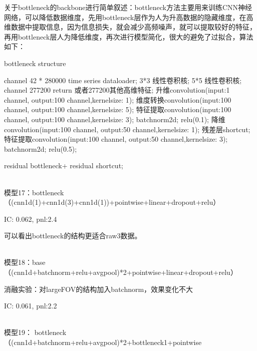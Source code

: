 \documentclass[11pt]{ctexart}
\begin{document}
关于bottleneck的backbone进行简单叙述：bottleneck方法主要用来训练CNN神经网络，可以降低数据维度，先用bottleneck层作为人为升高数据的隐藏维度，在高维数据中提取信息，因为信息损失，就会减少高频噪声，就可以提取较好的特征，再用bottleneck层人为降低维度，再次进行模型简化，很大的避免了过拟合，算法如下：
\renewcommand{\algorithmicrequire}{\textbf{Input:}}  %
\renewcommand{\algorithmicensure}{\textbf{Output:}} %
  \begin{algorithm}[htb]
  \caption{bottleneck structure}
  \label{alg:Framwork}
  \begin{algorithmic}[1]
     channel 42 * 280000 time series dataloader;
      3*3 线性卷积核;
      5*5 线性卷积核;
     channel 277200 return 或者277200其他高维特征;
    \State 升维convolution(input:1 channel, output:100 channel,kernelsize: 1);
    \label{code:fram:extract}
    \State 维度转换convolution(input:100 channel, output:100 channel,kernelsize: 5);
    \label{code:fram:trainbase}
    \State 特征提取convolution(input:100 channel, output:100 channel,kernelsize: 3);
    \label{code:fram:trainbase}
    \State batchnorm2d;
    \label{code:fram:trainbase}
    \State relu(0.1);
    \label{code:fram:select}
    \State 降维convolution(input:100 channel, output:50 channel,kernelsize: 1);
    \label{code:fram:decrease}
    \State 残差层shortcut;
    \label{code:fram:residual}
    \State 特征提取convolution(input:100 channel, output:50 channel,kernelsize: 3);
    \label{code:fram:residual}
    \State batchnorm2d;
    \label{code:fram:residual}
    \State relu(0.5);
    \label{code:fram:residual}

    \Return residual bottleneck+ residual shortcut;
  \end{algorithmic}
\end{algorithm}

~\\
模型17：bottleneck（(cnn1d(1)+cnn1d(3)+cnn1d(1))+pointwise+linear+dropout+relu）


{\kaishu \small IC: 0.062, pnl:2.4}

可以看出bottleneck的结构更适合raw3数据。


~\\
模型18：base（(cnn1d+batchnorm+relu+avgpool)*2+pointwise+linear+dropout+relu）

消融实验：对largeFOV的结构加入batchnorm，效果变化不大

{\kaishu \small IC: 0.061, pnl:2.2}


~\\
模型19： bottleneck（(cnn1d+batchnorm+relu+avgpool)*2+bottleneck1+pointwise
\end{document}
